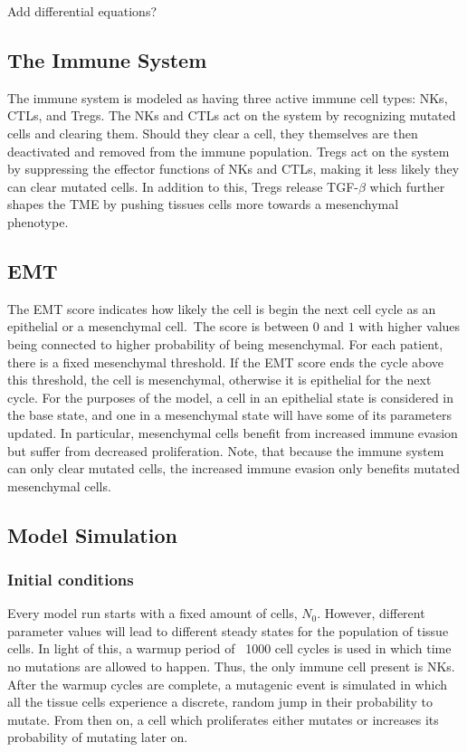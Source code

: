 \documentclass{article}
\begin{document}
Add differential equations? %

\subsection{The Immune System}\label{ImmuneSystem}
The immune system is modeled as having three active immune cell types: NKs, CTLs, and Tregs.
The NKs and CTLs act on the system by recognizing mutated cells and clearing them.
Should they clear a cell, they themselves are then deactivated and removed from the immune population.
Tregs act on the system by suppressing the effector functions of NKs and CTLs, making it less likely they can clear mutated cells.
In addition to this, Tregs release TGF-$\beta$ which further shapes the TME by pushing tissues cells more towards a mesenchymal phenotype.

\subsection{EMT}\label{EMT}
The EMT score indicates how likely the cell is begin the next cell cycle as an epithelial or a mesenchymal cell.\
The score is between $0$ and $1$ with higher values being connected to higher probability of being mesenchymal.
For each patient, there is a fixed mesenchymal threshold.
If the EMT score ends the cycle above this threshold, the cell is mesenchymal, otherwise it is epithelial for the next cycle.
For the purposes of the model, a cell in an epithelial state is considered in the base state, and one in a mesenchymal state will have some of its parameters updated.
In particular, mesenchymal cells benefit from increased immune evasion but suffer from decreased proliferation.
Note, that because the immune system can only clear mutated cells, the increased immune evasion only benefits mutated mesenchymal cells.

\subsection{Model Simulation}

\subsubsection{Initial conditions} Every model run starts with a fixed amount of cells, $N_0$.
However, different parameter values will lead to different steady states for the population of tissue cells.
In light of this, a warmup period of ~1000 cell cycles is used in which time no mutations are allowed to happen.
Thus, the only immune cell present is NKs.
After the warmup cycles are complete, a mutagenic event is simulated in which all the tissue cells experience a discrete, random jump in their probability to mutate.
From then on, a cell which proliferates either mutates or increases its probability of mutating later on.
\end{document}
